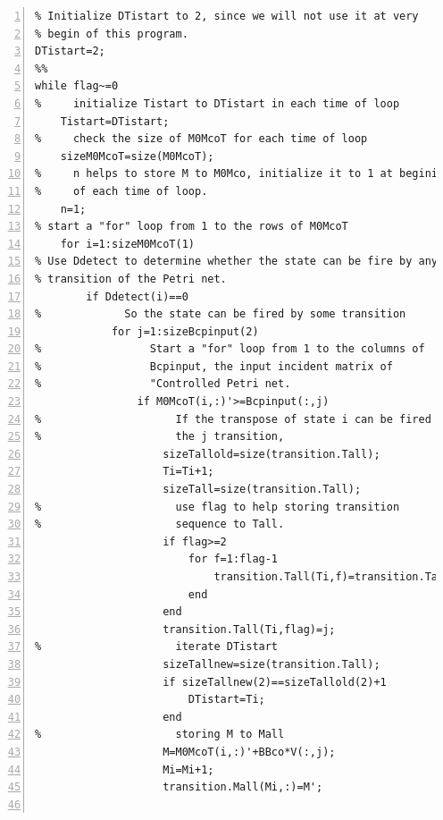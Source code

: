 \documentclass[11pt]{article}
\begin{document}
\begin{flushleft}
\begin{lstlisting}[numbers=left]
% Dtistart is used to help store transition sequence to Tall.
% Initialize DTistart to 2, since we will not use it at very
% begin of this program.
DTistart=2;
%%
while flag~=0
%     initialize Tistart to DTistart in each time of loop
    Tistart=DTistart;
%     check the size of M0McoT for each time of loop
    sizeM0McoT=size(M0McoT);
%     n helps to store M to M0Mco, initialize it to 1 at begining
%     of each time of loop.
    n=1;
% start a "for" loop from 1 to the rows of M0McoT
    for i=1:sizeM0McoT(1)
% Use Ddetect to determine whether the state can be fire by any
% transition of the Petri net.
        if Ddetect(i)==0
%             So the state can be fired by some transition
            for j=1:sizeBcpinput(2)
%                 Start a "for" loop from 1 to the columns of
%                 Bcpinput, the input incident matrix of
%                 "Controlled Petri net.
                if M0McoT(i,:)'>=Bcpinput(:,j)
%                     If the transpose of state i can be fired by
%                     the j transition,
                    sizeTallold=size(transition.Tall);    
                    Ti=Ti+1;
                    sizeTall=size(transition.Tall);
%                     use flag to help storing transition
%                     sequence to Tall.
                    if flag>=2
                        for f=1:flag-1
                            transition.Tall(Ti,f)=transition.Tall(Tistart,f);
                        end
                    end
                    transition.Tall(Ti,flag)=j;
%                     iterate DTistart
                    sizeTallnew=size(transition.Tall);
                    if sizeTallnew(2)==sizeTallold(2)+1
                        DTistart=Ti;
                    end
%                     storing M to Mall
                    M=M0McoT(i,:)'+BBco*V(:,j);
                    Mi=Mi+1;
                    transition.Mall(Mi,:)=M';


\end{lstlisting}
\end{flushleft}
\end{document}
